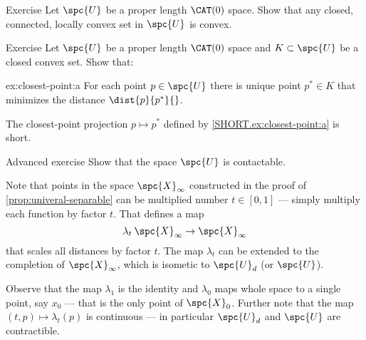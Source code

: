 \begin{thm}{Exercise}\label{ex:locally-convex}
Let $\spc{U}$ be a proper length $\CAT(0)$ space.
Show that any closed, connected, locally convex set in $\spc{U}$ is convex.
\end{thm}

\begin{thm}{Exercise}\label{ex:closest-point}
Let  $\spc{U}$ be a proper length $\CAT(0)$ space 
and $K\subset \spc{U}$ be a closed convex set.
Show that: 

\begin{subthm}{ex:closest-point:a}
For each point $p\in \spc{U}$ there is unique point $p^*\in K$ that minimizes the distance $\dist{p}{p^*}{}$.
\end{subthm}

\begin{subthm}{}
The closest-point projection $p\mapsto p^*$ defined by \ref{SHORT.ex:closest-point:a} is short. 
\end{subthm}

\end{thm}




















\begin{thm}{Advanced exercise}\label{ex:urysohn-contractable}
 Show that the space $\spc{U}$ is contactable.
\end{thm}


Note that points in the space $\spc{X}_\infty$ constructed in the proof of \ref{prop:univeral-separable} can be multiplied number $t\in [0,1]$ --- simply multiply each function by factor $t$.
That defines a map 
\[\lambda_t\:\spc{X}_\infty\to \spc{X}_\infty\]
that scales all distances by factor $t$.
The map $\lambda_t$ can be extended to the completion of $\spc{X}_\infty$, which is isometic to $\spc{U}_d$ (or $\spc{U}$).

Observe that 
the map $\lambda_1$ is the identity  and $\lambda_0$ maps whole space to a single point, say $x_0$ --- that is the only point of $\spc{X}_0$.
Further note that the map $(t,p)\mapsto \lambda_t(p)$ is continuous ---  in particular $\spc{U}_d$ and $\spc{U}$ are contractible.\qeds

